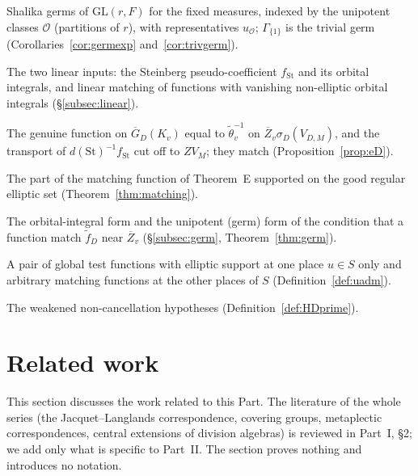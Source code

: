 \documentclass[12pt]{article}
\newcommand{\ov}[1]{\overline{#1}}
\newcommand{\reg}{\mathrm{reg}}
\newcommand{\GL}{\mathrm{GL}}
\newcommand{\St}{\mathrm{St}}
\newcommand{\Zb}{\ov{Z}}
\newcommand{\GDb}{\ov{G}_D}
\newcommand{\sg}{\sigma}
\theoremstyle{plain}
\theoremstyle{definition}
\begin{document}
\begin{description}[style=nextline,leftmargin=1.5em]
\item[$\Gamma_{\mathcal O}$, $u_{\mathcal O}$] Shalika germs of $\GL(r,F)$ for the fixed measures, indexed by the unipotent classes $\mathcal O$ (partitions of $r$), with representatives $u_{\mathcal O}$; $\Gamma_{\{1\}}$ is the trivial germ (Corollaries~\ref{cor:germexp} and~\ref{cor:trivgerm}).
\item[(L1), (L2); $f_{\St}$] The two linear inputs: the Steinberg pseudo-coefficient $f_{\St}$ and its orbital integrals, and linear matching of functions with vanishing non-elliptic orbital integrals (\S\ref{subsec:linear}).
\item[$e_D$, $\tilde f^{\St}$] The genuine function on $\GDb(K_v)$ equal to $\tilde\theta_v^{-1}$ on $\Zb_v\sg_D(V_{D,M})$, and the transport of $d(\St)^{-1}f_{\St}$ cut off to $ZV_M$; they match (Proposition~\ref{prop:eD}).
\item[$\tilde f_{\reg}$] The part of the matching function of Theorem~E supported on the good regular elliptic set (Theorem~\ref{thm:matching}).
\item[(Ell), (Non); (G1), (G2)] The orbital-integral form and the unipotent (germ) form of the condition that a function match $\tilde f_D$ near $\Zb_v$ (\S\ref{subsec:germ}, Theorem~\ref{thm:germ}).
\item[$u$-admissible pair] A pair of global test functions with elliptic support at one place $u\in S$ only and arbitrary matching functions at the other places of $S$ (Definition~\ref{def:uadm}).
\item[$(\mathrm H_D')$, $(\mathrm H')$] The weakened non-cancellation hypotheses (Definition~\ref{def:HDprime}).
\end{description}

\section{Related work}\label{sec:lit}
This section discusses the work related to this Part. The literature of the whole series (the Jacquet--Langlands correspondence, covering groups, metaplectic correspondences, central extensions of division algebras) is reviewed in Part~I, \S2; we add only what is specific to Part~II. The section proves nothing and introduces no notation.
\end{document}
